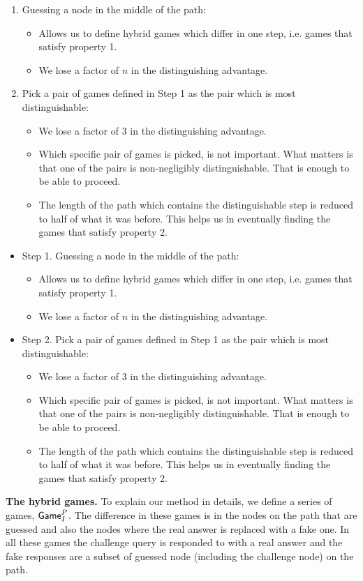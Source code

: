\documentclass{article}
\newcommand{\game}{{\sf Game}}
\newcommand{\dgg}[2]{\game_{#1}^{#2}}
\begin{document}
\begin{enumerate}[Step 1.]
\item Guessing a node in the middle of the path: \begin{itemize} \item Allows us to define hybrid games which differ in one step, i.e. games that satisfy property 1. \item We lose a factor of $n$ in the distinguishing advantage. \end{itemize}
\item Pick a pair of games defined in Step 1 as the pair which is most distinguishable: \begin{itemize} \item We lose a factor of 3 in the distinguishing advantage. \item  Which specific pair of games is picked, is not important. What matters is that one of the pairs is non-negligibly distinguishable. That is enough to be able to proceed. \item The length of the path which contains the distinguishable step is reduced to half of what it was before. This helps us in eventually finding the games that satisfy property 2.
\end{itemize}
\end{enumerate}
\else

\begin{itemize}
\item Step 1. Guessing a node in the middle of the path: \begin{itemize} \item Allows us to define hybrid games which differ in one step, i.e. games that satisfy property 1. \item We lose a factor of $n$ in the distinguishing advantage. \end{itemize}
\item Step 2. Pick a pair of games defined in Step 1 as the pair which is most distinguishable: \begin{itemize} \item We lose a factor of 3 in the distinguishing advantage. \item  Which specific pair of games is picked, is not important. What matters is that one of the pairs is non-negligibly distinguishable. That is enough to be able to proceed. \item The length of the path which contains the distinguishable step is reduced to half of what it was before. This helps us in eventually finding the games that satisfy property 2.
\end{itemize}
\end{itemize}
\fi
\textbf{The hybrid games.} To explain our method in details, we define a series of games, $\dgg{I}{P}$. The difference in these games is in the nodes on the path that are guessed and also the nodes where the real answer is replaced with a fake one. In all these games the challenge query is responded to with a real answer and the fake responses are a subset of guessed node (including the challenge node) on the path. 
\end{document}
